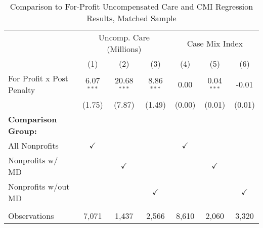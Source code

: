 \begin{table}[htbp]
   \caption{\label{tab:forprofit_uncomp_CMI_matchsample} Comparison to For-Profit Uncompensated Care and CMI Regression Results, Matched Sample}
   \bigskip
   \centering
   \begin{tabular}{lcccccc}
      \toprule
       & \multicolumn{3}{c}{Uncomp. Care (Millions)} & \multicolumn{3}{c}{Case Mix Index}\\
                                  & (1)           & (2)           & (3)           & (4)           & (5)           & (6)\\  
      \midrule 
      For Profit x Post Penalty   & 6.07$^{***}$  & 20.68$^{***}$ & 8.86$^{***}$  & 0.00          & 0.04$^{***}$  & -0.01\\   
                                  & (1.75)        & (7.87)        & (1.49)        & (0.00)        & (0.01)        & (0.01)\\   
      \textbf{Comparison Group:}  &               &               &               &               &               & \\  
      All Nonprofits              & $\checkmark$  &               &               & $\checkmark$  &               & \\  
      Nonprofits w/ MD            &               & $\checkmark$  &               &               & $\checkmark$  & \\  
      Nonprofits w/out MD         &               &               & $\checkmark$  &               &               & $\checkmark$\\   
       \\
      Observations                & 7,071         & 1,437         & 2,566         & 8,610         & 2,060         & 3,320\\  
      \bottomrule
   \end{tabular}
\end{table}
